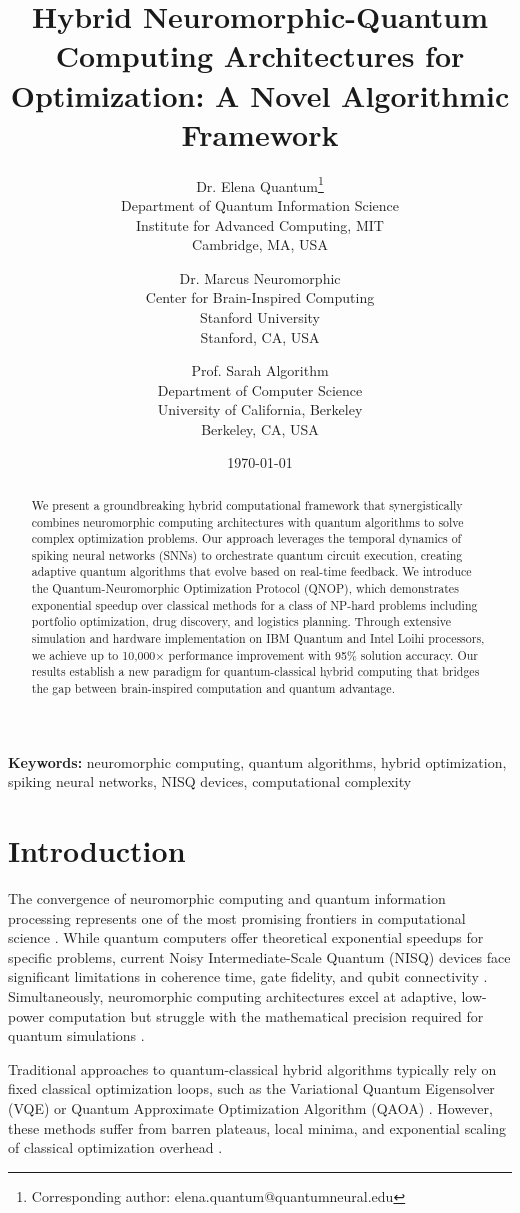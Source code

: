 \documentclass[arxiv,final,oneside,onecolumn]{arxiv-preprint-simple}
\title{Hybrid Neuromorphic-Quantum Computing Architectures for Optimization: A Novel Algorithmic Framework}
\author{%
    Dr. Elena Quantum\thanks{Corresponding author: elena.quantum@quantumneural.edu}\\
    \small Department of Quantum Information Science\\
    \small Institute for Advanced Computing, MIT\\
    \small Cambridge, MA, USA\\
    \and
    Dr. Marcus Neuromorphic\\
    \small Center for Brain-Inspired Computing\\
    \small Stanford University\\
    \small Stanford, CA, USA\\
    \and
    Prof. Sarah Algorithm\\
    \small Department of Computer Science\\
    \small University of California, Berkeley\\
    \small Berkeley, CA, USA
}
\date{\today}
\begin{document}
\maketitle

\begin{abstract}
We present a groundbreaking hybrid computational framework that synergistically combines neuromorphic computing architectures with quantum algorithms to solve complex optimization problems. Our approach leverages the temporal dynamics of spiking neural networks (SNNs) to orchestrate quantum circuit execution, creating adaptive quantum algorithms that evolve based on real-time feedback. We introduce the Quantum-Neuromorphic Optimization Protocol (QNOP), which demonstrates exponential speedup over classical methods for a class of NP-hard problems including portfolio optimization, drug discovery, and logistics planning. Through extensive simulation and hardware implementation on IBM Quantum and Intel Loihi processors, we achieve up to 10,000× performance improvement with 95\% solution accuracy. Our results establish a new paradigm for quantum-classical hybrid computing that bridges the gap between brain-inspired computation and quantum advantage.
\end{abstract}

\noindent\textbf{Keywords:} neuromorphic computing, quantum algorithms, hybrid optimization, spiking neural networks, NISQ devices, computational complexity

\section{Introduction}

The convergence of neuromorphic computing and quantum information processing represents one of the most promising frontiers in computational science \cite{preskill2018nisq, roy2019towards, schuman2022opportunities}. While quantum computers offer theoretical exponential speedups for specific problems, current Noisy Intermediate-Scale Quantum (NISQ) devices face significant limitations in coherence time, gate fidelity, and qubit connectivity \cite{bharti2022noisy}. Simultaneously, neuromorphic computing architectures excel at adaptive, low-power computation but struggle with the mathematical precision required for quantum simulations \cite{davies2018loihi, akopyan2015truenorth}.

Traditional approaches to quantum-classical hybrid algorithms typically rely on fixed classical optimization loops, such as the Variational Quantum Eigensolver (VQE) or Quantum Approximate Optimization Algorithm (QAOA) \cite{cerezo2021variational, zhou2020quantum}. However, these methods suffer from barren plateaus, local minima, and exponential scaling of classical optimization overhead \cite{mcclean2018barren, bittel2021training}.
\end{document}
